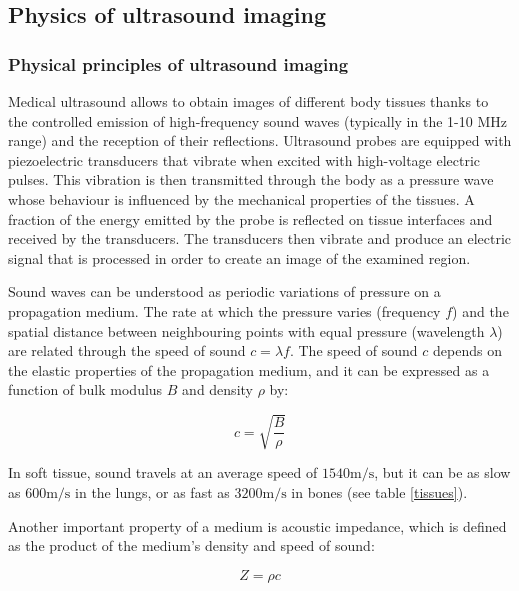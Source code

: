 \documentclass[12pt]{article} %
\begin{document}
	
\subsection{Physics of ultrasound imaging}
\subsubsection{Physical principles of ultrasound imaging}


	Medical ultrasound allows to obtain images of different body tissues thanks to the controlled emission of high-frequency sound waves (typically in the 1-10 MHz range) and the reception of their reflections. Ultrasound probes are equipped with piezoelectric transducers that vibrate when excited with high-voltage electric pulses. This vibration is then transmitted through the body as a pressure wave whose behaviour is influenced by the mechanical properties of the tissues. A fraction of the energy emitted by the probe is reflected on tissue interfaces and received by the transducers. The transducers then vibrate and produce an electric signal that is processed in order to create an image of the examined region. 
	
	
	Sound waves can be understood as periodic variations of pressure on a propagation medium. The rate at which the pressure varies (frequency $f$) and the spatial distance between neighbouring points with equal pressure (wavelength $\lambda$) are related through the speed of sound $c = \lambda f$. The speed of sound $c$ depends on the elastic properties of the propagation medium, and it can be expressed as a function of bulk modulus $B$ and density $\rho$ by:
	
\begin{equation}
c = \sqrt{ \frac{B}{\rho} }
\end{equation}
	
	In soft tissue, sound travels at an average speed of $ 1540 \si{\meter\per\second} $, but it can be as slow as $ 600 \si{\meter\per\second} $ in the lungs, or as fast as $ 3200 \si{\meter\per\second} $ in bones (see table \ref{tissues}). 
	
	
	Another important property of a medium is acoustic impedance, which is defined as the product of the medium's density and speed of sound: 	

\begin{equation}
Z = \rho c
\end{equation}
\end{document}
